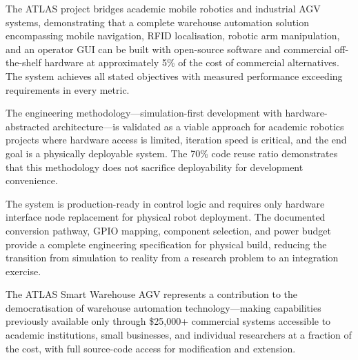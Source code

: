 \documentclass[12pt,a4paper,oneside]{report}
\begin{document}
The ATLAS project bridges academic mobile robotics and industrial AGV systems, demonstrating that a complete warehouse automation solution encompassing mobile navigation, RFID localisation, robotic arm manipulation, and an operator GUI can be built with open-source software and commercial off-the-shelf hardware at approximately 5\% of the cost of commercial alternatives. The system achieves all stated objectives with measured performance exceeding requirements in every metric.

The engineering methodology---simulation-first development with hardware-abstracted architecture---is validated as a viable approach for academic robotics projects where hardware access is limited, iteration speed is critical, and the end goal is a physically deployable system. The 70\% code reuse ratio demonstrates that this methodology does not sacrifice deployability for development convenience.

The system is production-ready in control logic and requires only hardware interface node replacement for physical robot deployment. The documented conversion pathway, GPIO mapping, component selection, and power budget provide a complete engineering specification for physical build, reducing the transition from simulation to reality from a research problem to an integration exercise.

The ATLAS Smart Warehouse AGV represents a contribution to the democratisation of warehouse automation technology---making capabilities previously available only through \$25,000+ commercial systems accessible to academic institutions, small businesses, and individual researchers at a fraction of the cost, with full source-code access for modification and extension.
\end{document}
